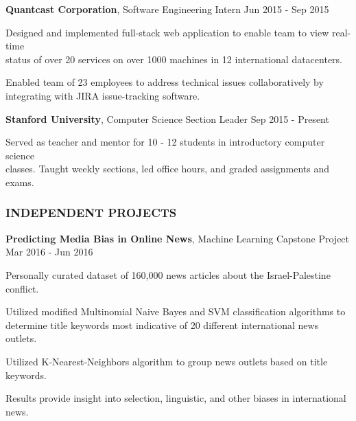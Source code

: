 \documentclass[11pt,letterpaper]{article}%
\begin{document}
\vspace{-.3em}
\hspace{.6em} 
{\bf Quantcast Corporation}, Software Engineering Intern \hfill Jun 2015 - Sep 2015
\vspace{-.6em}
\begin{itemize*}
\item Designed and implemented full-stack web application to enable team to view real-time \\ status of over 20 services on over 1000 machines in 12 international datacenters. 
\item Enabled team of 23 employees to address technical issues collaboratively by \\ integrating with JIRA issue-tracking software.
\end{itemize*}

\vspace{-.3em}
\hspace{.6em} 
{\bf Stanford University}, Computer Science Section Leader \hfill Sep 2015 - Present
\vspace{-.6em}
\begin{itemize*}
\item Served as teacher and mentor for 10 - 12 students in introductory computer science \\ classes. Taught weekly sections, led office hours, and graded assignments and exams.
\end{itemize*} 

\vspace{-1em}
\hrulefill 
\subsubsection*{INDEPENDENT PROJECTS}
\vspace{-1ex}
\hrulefill

\vspace{.3em}
\hspace{0.6em}
{\bf Predicting Media Bias in Online News}, Machine Learning Capstone Project \hfill Mar 2016 - Jun 2016
\vspace{-.6em}
\begin{itemize*}
\item Personally curated dataset of 160,000 news articles about the Israel-Palestine conflict.
\item Utilized modified Multinomial Naive Bayes and SVM classification algorithms
to \\ determine title keywords most indicative of 20 different international news outlets.
\item Utilized K-Nearest-Neighbors algorithm to group news outlets based on title keywords.
\item Results provide insight into selection, linguistic, and other biases in international news.
\end{itemize*}
\end{document}
